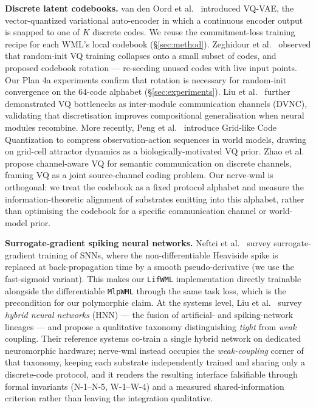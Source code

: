 \documentclass[10pt,twocolumn]{article}
\begin{document}
\textbf{Discrete latent codebooks.} van den Oord et al.~\cite{vandenoord2017neural} introduced VQ-VAE, the vector-quantized variational auto-encoder in which a continuous encoder output is snapped to one of $K$ discrete codes. We reuse the commitment-loss training recipe for each WML's local codebook (\S\ref{sec:method}). Zeghidour et al.~\cite{zeghidour2022soundstream} observed that random-init VQ training collapses onto a small subset of codes, and proposed codebook rotation --- re-seeding unused codes with live input points. Our Plan 4a experiments confirm that rotation is necessary for random-init convergence on the $64$-code alphabet (\S\ref{sec:experiments}). Liu et al.~\cite{liu2021dvnc} further demonstrated VQ bottlenecks as inter-module communication channels (DVNC), validating that discretisation improves compositional generalisation when neural modules recombine. More recently, Peng et al.~\cite{peng2025gridlikevq} introduce Grid-like Code Quantization to compress observation-action sequences in world models, drawing on grid-cell attractor dynamics as a biologically-motivated VQ prior. Zhao et al.~\cite{zhao2025channelawarevq} propose channel-aware VQ for semantic communication on discrete channels, framing VQ as a joint source-channel coding problem. Our nerve-wml is orthogonal: we treat the codebook as a fixed protocol alphabet and measure the information-theoretic alignment of substrates emitting into this alphabet, rather than optimising the codebook for a specific communication channel or world-model prior.

\textbf{Surrogate-gradient spiking neural networks.} Neftci et al.~\cite{neftci2019surrogate} survey surrogate-gradient training of SNNs, where the non-differentiable Heaviside spike is replaced at back-propagation time by a smooth pseudo-derivative (we use the fast-sigmoid variant). This makes our \texttt{LifWML} implementation directly trainable alongside the differentiable \texttt{MlpWML} through the same task loss, which is the precondition for our polymorphie claim. At the systems level, Liu et al.~\cite{liu2024hybrid} survey \emph{hybrid neural networks} (HNN) --- the fusion of artificial- and spiking-network lineages --- and propose a qualitative taxonomy distinguishing \emph{tight} from \emph{weak} coupling. Their reference systems co-train a single hybrid network on dedicated neuromorphic hardware; nerve-wml instead occupies the \emph{weak-coupling} corner of that taxonomy, keeping each substrate independently trained and sharing only a discrete-code protocol, and it renders the resulting interface falsifiable through formal invariants (N-1--N-5, W-1--W-4) and a measured shared-information criterion rather than leaving the integration qualitative.
\end{document}
